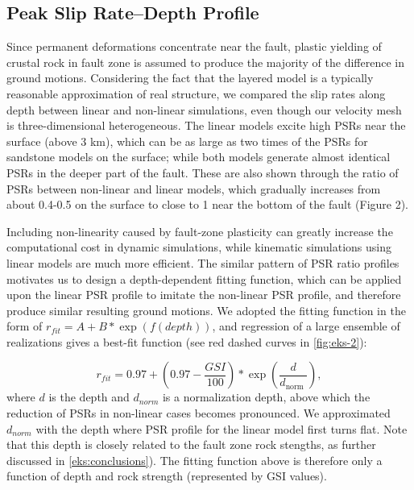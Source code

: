 \subsection{Peak Slip Rate–Depth Profile}
Since permanent deformations concentrate near the fault, plastic yielding of crustal rock in fault zone is assumed to produce the majority of the difference in ground motions. Considering the fact that the layered model is a typically reasonable approximation of real structure, we compared the slip rates along depth between linear and non-linear simulations, even though our velocity mesh is three-dimensional heterogeneous. The linear models excite high PSRs near the surface (above 3 km), which can be as large as two times of the PSRs for sandstone models on the surface; while both models generate almost identical PSRs in the deeper part of the fault. These are also shown through the ratio of PSRs between non-linear and linear models, which gradually increases from about 0.4-0.5 on the surface to close to 1 near the bottom of the fault (Figure 2).

Including non-linearity caused by fault-zone plasticity can greatly increase the computational cost in dynamic simulations, while kinematic simulations using linear models are much more efficient. The similar pattern of PSR ratio profiles motivates us to design a depth-dependent fitting function, which can be applied upon the linear PSR profile to imitate the non-linear PSR profile, and therefore produce similar resulting ground motions. We adopted the fitting function in the form of $r_{fit}=A+B * \exp \left(f(depth)\right)$, and regression of a large ensemble of realizations gives a best-fit function (see red dashed curves in \cref{fig:eks-2}):

\begin{equation}\label{eq:eks-2}
    r_{f i t}=0.97+\left(0.97-\frac{G S I}{100}\right) * \exp \left(\frac{d}{d_{\text {norm }}}\right),
\end{equation}
where $d$ is the depth and $d_{norm}$ is a normalization depth, above which the reduction of PSRs in non-linear cases becomes pronounced. We approximated $d_{norm}$ with the depth where PSR profile for the linear model first turns flat. Note that this depth is closely related to the fault zone rock stengths, as further discussed in \cref{eks:conclusions}). The fitting function above is therefore only a function of depth and rock strength (represented by GSI values).

